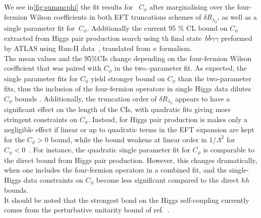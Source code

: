 	\par
	We see in\autoref{fig:summcphi} the fit results for~ $C_\phi$ after marginalising over the four-fermion Wilson coefficients in both EFT truncations schemes of $\delta R_{\lambda_3}$, as well as a single parameter fit for~$C_{\phi}$. Additionally the current 95 \% CL bound on $C_\phi$ extracted from Higgs pair production search using th final state~$b\bar{b} \gamma \gamma$ preformed by ATLAS using Run-II data~\cite{ATLAS:2021jki}, translated from $\kappa$ formalism.\\ The mean values and the 95\%CIs change depending on the four-fermion Wilson coefficient that was paired with $C_\phi$ in the two.-parameter fit. As expected, the single parameter fits for $C_\phi$ yield stronger bound on $C_\phi$ than the two-parameter fits, thus the inclusion of the four-fermion operators in single Higgs data dilutes $C_\phi$ bounds .  Additionally, the truncation order of  $\delta R_{\lambda_3}$ appears to have a significant effect on the length of the CIs, with quadratic fits giving more stringent constraints on $C_\phi$. Instead, for Higgs pair production  is makes only a negligible effect  if linear or up to quadratic terms in the EFT expansion are kept  for the $C_\phi>0$ bound, while the bound weakens at linear order in $1/\Lambda^2$ for $C_\phi<0$~\cite{IML}. For instance, the quadratic single parameter fit for $C_\phi$ is comparable to the direct bound from Higgs pair production. However, this changes dramatically, when one includes the four-fermion operators in a combined fit, and the single-Higgs data constraints on $C_\phi$ become less significant compared to the direct $hh$ bounds. \\
	It should be noted that the strongest bond on the Higgs self-coupling currently comes from the perturbative unitarity bound of ref.~\cite{DiLuzio:2017tfn}.
